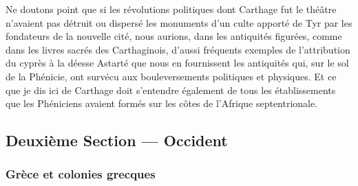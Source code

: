 \documentclass{article}
\begin{document}
Ne doutons point que si les révolutions politiques dont Carthage fut le théâtre n'avaient pas détruit ou dispersé les monuments d'un culte apporté de Tyr par les fondateurs de la nouvelle cité, nous aurions, dans les antiquités figurées, comme dans les livres sacrés des Carthaginois, d'aussi fréquents exemples de l'attribution du cyprès à la déesse Astarté que nous en fournissent les antiquités qui, sur le sol de la Phénicie, ont survécu aux bouleversements politiques et physiques. Et ce que je dis ici de Carthage doit s'entendre également de tous les établissements que les Phéniciens avaient formés sur les côtes de l'Afrique septentrionale.

\clearpage
\subsection{Deuxième Section --- Occident}
\subsubsection{Grèce et colonies grecques}
\end{document}
